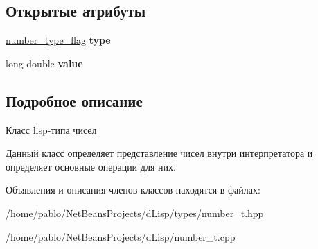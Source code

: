 \subsection*{Открытые атрибуты}
\begin{DoxyCompactItemize}
\item 
\mbox{\label{classnumber__t_ab8105972a213fef8d6a25613f67447bd}} 
\mbox{\hyperlink{number__t_8hpp_a9c37ed0386636f462116b6e8d1fd8312}{number\+\_\+type\+\_\+flag}} {\bfseries type}
\item 
\mbox{\label{classnumber__t_a1ff6668c69c1642df4a2200ee9a87184}} 
long double {\bfseries value}
\end{DoxyCompactItemize}


\subsection{Подробное описание}
Класс lisp-\/типа чисел 

Данный класс определяет представление чисел внутри интерпретатора и определяет основные операции для них. 

Объявления и описания членов классов находятся в файлах\+:\begin{DoxyCompactItemize}
\item 
/home/pablo/\+Net\+Beans\+Projects/d\+Lisp/types/\mbox{\hyperlink{number__t_8hpp}{number\+\_\+t.\+hpp}}\item 
/home/pablo/\+Net\+Beans\+Projects/d\+Lisp/number\+\_\+t.\+cpp\end{DoxyCompactItemize}
